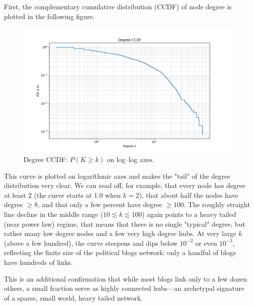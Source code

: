 \documentclass{article}
\begin{document}
First, the complementary cumulative distribution (CCDF) of node degree is plotted in the following figure.
\begin{figure}[H]
  \centering
  \includegraphics[width=1\textwidth]{../images/degree_ccdf.png}
  \caption{Degree CCDF: \(P(K \ge k)\) on log–log axes.}
  \label{fig:degree-ccdf}
\end{figure} 


This curve is plotted on logarithmic axes and makes the "tail" of the degree distribution very clear. We can read off, for example, that every node has degree at least 2 (the curve starts at 1.0 when $k=2$), that about half the nodes have degree $\geq 8$, and that only a few percent have degree $\geq 100$. 
The roughly straight line decline in the middle range ($10 \lesssim k \lesssim 100$) again points to a heavy tailed (near power law) regime, that means that there is no single "typical" degree, but rather many low degree nodes and a few very high degree hubs. At very large $k$ (above a few hundred), the curve steepens and dips below $10^{-2}$ or even $10^{-3}$, reflecting the finite size of the political blogs network: only a handful of blogs have hundreds of links.

This is an additional confirmation that while most blogs link only to a few dozen others, a small fraction serve as highly connected hubs—an archetypal signature of a sparse, small world, heavy tailed network.
\end{document}
